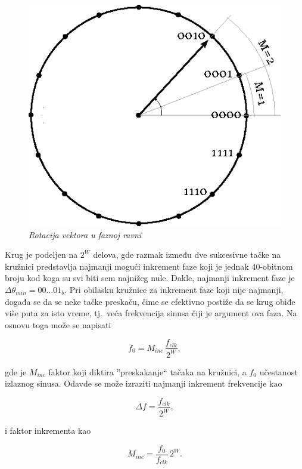 \documentclass[conference]{IEEEtran}
\begin{document}
\begin{figure}[h]
	\centering
	\includegraphics[scale=0.6]{./slike/faznaravan.eps}
	\caption{\textsl{Rotacija vektora u faznoj ravni}}
	\label{slika:faznaravan}
\end{figure}

Krug je podeljen na $2^W$ delova, gde razmak između dve sukcesivne tačke na kružnici predstavlja najmanji mogući inkrement faze koji je jednak $40$-obitnom broju kod koga su svi biti sem najnižeg nule. Dakle, najmanji inkrement faze je $\Delta \theta_{min}=00\ldots01_b$. Pri obilasku kružnice za inkrement faze koji nije najmanji, događa se da se neke tačke preskaču, čime se efektivno postiže da se krug obiđe više puta za isto vreme, tj.~veća frekvencija sinusa čiji je argument ova faza. Na osnovu toga može se napisati

\begin{equation}
f_{0} = M_{inc}\,\frac{f_{clk}}{2^W} ,
\end{equation}

\noindent gde je $M_{inc}$ faktor koji diktira ''preskakanje`` tačaka na kružnici, a $f_{0}$ učestanost izlaznog sinusa. Odavde se može izraziti najmanji inkrement frekvencije kao

\begin{equation}\label{eq:deltaf}
\Delta f = \frac{f_{clk}}{2^W} ,
\end{equation}

\noindent i faktor inkrementa kao

\begin{equation}\label{eq:Minc}
M_{inc} = \frac{f_{0}}{f_{clk}}\,2^W .
\end{equation}
\end{document}
